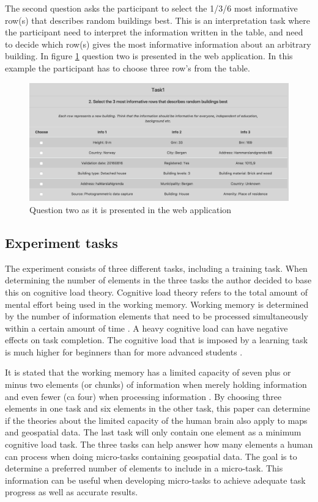 The second question asks the participant to select the 1/3/6 most informative row(s) that describes random buildings best. This is an interpretation task where the participant need to interpret the information written in the table, and need to decide which row(s) gives the most informative information about an arbitrary building. In figure \ref{fig:q22} question two is presented in the web application. In this example the participant has to choose three row's from the table. 

\begin{figure}[H]
	\centering
	\includegraphics[width=0.8\linewidth]{fig/q2_2}
	\caption{Question two as it is presented in the web application}
	\label{fig:q22}
\end{figure}

\subsection{Experiment tasks}\label{sec:experimenttasks}
The experiment consists of three different tasks, including a training task. When determining the number of elements in the three tasks the author decided to base this on cognitive load theory. Cognitive load theory refers to the total amount of mental effort being used in the working memory. Working memory is determined by the number of information elements that need to be processed simultaneously within a certain amount of time \citep{Barrouillet2007}. A heavy cognitive load can have negative effects on task completion. The cognitive load that is imposed by a learning task is much higher for beginners than for more advanced students \citep{Leppink2014a}.  

It is stated that the working memory has a limited capacity of seven plus or minus two elements (or chunks) of information when merely holding information and even fewer (ca four) when processing information \citep{Leppink2014a}. By choosing three elements in one task and six elements in the other task, this paper can determine if the theories about the limited capacity of the human brain also apply to maps and geospatial data. The last task will only contain one element as a minimum cognitive load task. The three tasks can help answer how many elements a human can process when doing micro-tasks containing geospatial data. The goal is to determine a preferred number of elements to include in a micro-task. This information can be useful when developing micro-tasks to achieve adequate task progress as well as accurate results.

